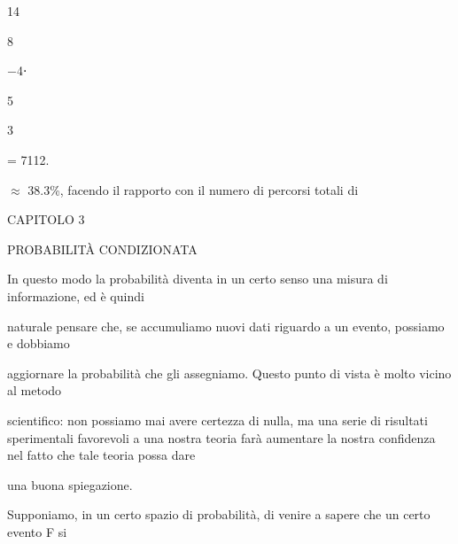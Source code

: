 \documentclass[a4paper,portrait,12pt]{article}
\begin{document}
14


8


$-$4⋅


5


3





= 7112.





\begin{flushleft}
$\approx$ 38.3\%, facendo il rapporto con il numero di percorsi totali di
\end{flushleft}





\begin{flushleft}
\newpage
\newpage
CAPITOLO 3
\end{flushleft}


\begin{flushleft}
PROBABILIT\`{A} CONDIZIONATA
\end{flushleft}


\begin{flushleft}
In questo modo la probabilit\`{a} diventa in un certo senso una misura di informazione, ed \`{e} quindi
\end{flushleft}


\begin{flushleft}
naturale pensare che, se accumuliamo nuovi dati riguardo a un evento, possiamo e dobbiamo
\end{flushleft}


\begin{flushleft}
aggiornare la probabilit\`{a} che gli assegniamo. Questo punto di vista \`{e} molto vicino al metodo
\end{flushleft}


\begin{flushleft}
scientifico: non possiamo mai avere certezza di nulla, ma una serie di risultati sperimentali favorevoli a una nostra teoria far\`{a} aumentare la nostra confidenza nel fatto che tale teoria possa dare
\end{flushleft}


\begin{flushleft}
una buona spiegazione.
\end{flushleft}


\begin{flushleft}
Supponiamo, in un certo spazio di probabilit\`{a}, di venire a sapere che un certo evento F si
\end{flushleft}
\end{document}
